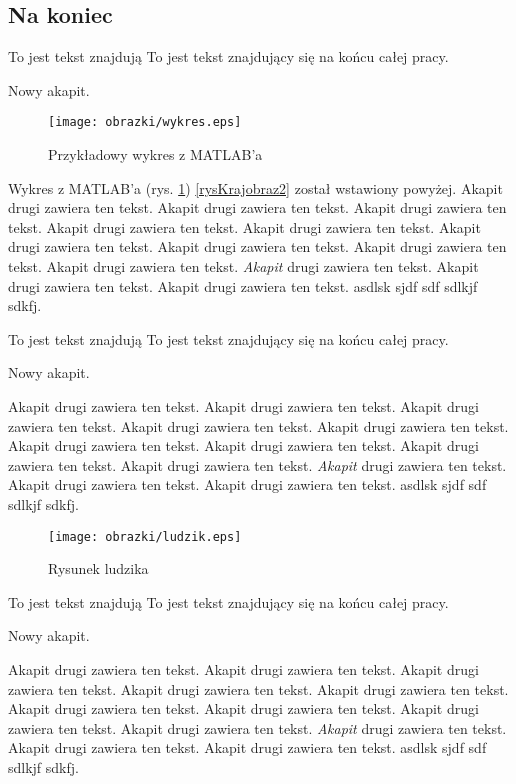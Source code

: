 \subsection {Na koniec}

To jest tekst znajdują
To jest tekst znajdujący się na końcu całej pracy.

Nowy akapit.

\begin{figure}[htb]
\centering
\texttt{[image: obrazki/wykres.eps]}
\caption{Przykładowy wykres z MATLAB'a}
\label{wyk1}
\end{figure}

Wykres z MATLAB'a (rys. \ref{wyk1}) \ref{rysKrajobraz2} został wstawiony powyżej.
Akapit drugi zawiera ten tekst. Akapit drugi zawiera ten tekst. Akapit drugi zawiera ten tekst.
Akapit drugi zawiera ten tekst. Akapit drugi zawiera ten tekst. Akapit drugi zawiera ten tekst.
Akapit drugi zawiera ten tekst. Akapit drugi zawiera ten tekst. Akapit drugi zawiera ten tekst.
\emph{Akapit} drugi zawiera ten tekst. Akapit drugi zawiera ten tekst. Akapit drugi zawiera ten tekst.
asdlsk sjdf sdf sdlkjf sdkfj.


To jest tekst znajdują
To jest tekst znajdujący się na końcu całej pracy.

Nowy akapit.

Akapit drugi zawiera ten tekst. Akapit drugi zawiera ten tekst. Akapit drugi zawiera ten tekst.
Akapit drugi zawiera ten tekst. Akapit drugi zawiera ten tekst. Akapit drugi zawiera ten tekst.
Akapit drugi zawiera ten tekst. Akapit drugi zawiera ten tekst. Akapit drugi zawiera ten tekst.
\emph{Akapit} drugi zawiera ten tekst. Akapit drugi zawiera ten tekst. Akapit drugi zawiera ten tekst.
asdlsk sjdf sdf sdlkjf sdkfj.


\begin{figure}[htb]
\centering
\texttt{[image: obrazki/ludzik.eps]}
\caption{Rysunek ludzika}
\label{fig1}
\end{figure}

To jest tekst znajdują
To jest tekst znajdujący się na końcu całej pracy.

Nowy akapit.


Akapit drugi zawiera ten tekst. Akapit drugi zawiera ten tekst. Akapit drugi zawiera ten tekst.
Akapit drugi zawiera ten tekst. Akapit drugi zawiera ten tekst. Akapit drugi zawiera ten tekst.
Akapit drugi zawiera ten tekst. Akapit drugi zawiera ten tekst. Akapit drugi zawiera ten tekst.
\emph{Akapit} drugi zawiera ten tekst. Akapit drugi zawiera ten tekst. Akapit drugi zawiera ten tekst.
asdlsk sjdf sdf sdlkjf sdkfj.


